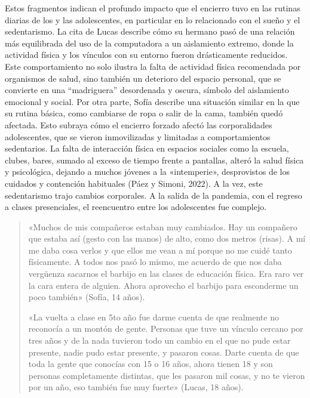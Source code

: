 Estos fragmentos indican el profundo impacto que el encierro tuvo en las rutinas diarias de los y las adolescentes, en particular en lo relacionado con el sueño y el sedentarismo. La cita de Lucas describe cómo su hermano pasó de una relación más equilibrada del uso de la computadora a un aislamiento extremo, donde la actividad física y los vínculos con su entorno fueron drásticamente reducidos. Este comportamiento no solo ilustra la falta de actividad física recomendada por organismos de salud, sino también un deterioro del espacio personal, que se convierte en una ``madriguera'' desordenada y oscura, símbolo del aislamiento emocional y social. Por otra parte, Sofía describe una situación similar en la que su rutina básica, como cambiarse de ropa o salir de la cama, también quedó afectada. Esto subraya cómo el encierro forzado afectó las corporalidades adolescentes, que se vieron inmovilizadas y limitadas a comportamientos sedentarios. La falta de interacción física en espacios sociales como la escuela, clubes, bares, sumado al exceso de tiempo frente a pantallas, alteró la salud física y psicológica, dejando a muchos jóvenes a la «intemperie», desprovistos de los cuidados y contención habituales (Páez y Simoni, 2022). A la vez, este sedentarismo trajo cambios corporales. A la salida de la pandemia, con el regreso a clases presenciales, el reencuentro entre los adolescentes fue complejo.

\begin{quote}
«Muchos de mis compañeros estaban muy cambiados. Hay un compañero que estaba así (gesto con las manos) de alto, como dos metros (risas). A mí me daba cosa verlos y que ellos me vean a mí porque no me cuidé tanto físicamente. A todos nos pasó lo mismo, me acuerdo de que nos daba vergüenza sacarnos el barbijo en las clases de educación física. Era raro ver la cara entera de alguien. Ahora aprovecho el barbijo para esconderme un poco también» (Sofía, 14 años).

«La vuelta a clase en 5to año fue darme cuenta de que realmente no reconocía a un montón de gente. Personas que tuve un vínculo cercano por tres años y de la nada tuvieron todo un cambio en el que no pude estar presente, nadie pudo estar presente, y pasaron cosas. Darte cuenta de que toda la gente que conocías con 15 o 16 años, ahora tienen 18 y son personas completamente distintas, que les pasaron mil cosas, y no te vieron por un año, eso también fue muy fuerte» (Lucas, 18 años).
\end{quote}

